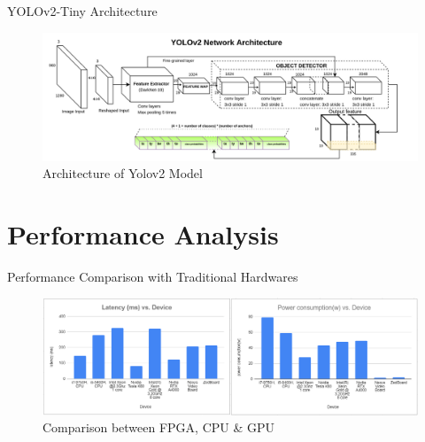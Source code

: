 \documentclass[10pt, a4paper]{beamer}
\begin{document}
\begin{frame}{YOLOv2-Tiny Architecture}
	\begin{figure}
		\centering
		\includegraphics[scale=0.175]{yolov2-architecture}
		\caption{Architecture of Yolov2 Model}
	\end{figure}
\end{frame}


\section{Performance Analysis}
\begin{frame}{Performance Comparison with Traditional Hardwares}
	\begin{figure}
		\centering
		\includegraphics[width=\linewidth]{performance-plus}
		\caption{Comparison between FPGA, CPU \& GPU}
	\end{figure}
\end{frame}
\end{document}
